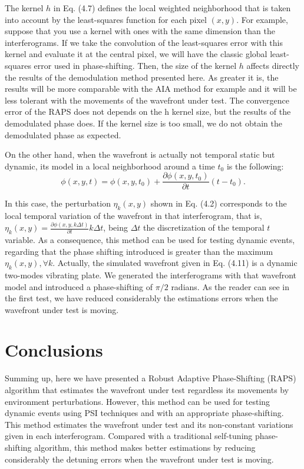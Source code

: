 The kernel $h$ in Eq. (4.7) defines the local weighted neighborhood that is
taken into account by the least-squares function for each pixel $(x,y)$. For
example, suppose that you use a kernel with ones with the same dimension than
the interferograms. If we take the convolution of the least-squares error with
this kernel and evaluate it at the central pixel, we will have the classic
global least-squares error used in phase-shifting. Then, the size of the kernel
$h$ affects directly the results of the demodulation method presented here. As
greater it is, the results will be more comparable with the AIA method for
example and it will be less tolerant with the movements of the wavefront under
test. The convergence error of the RAPS does not depends on the h kernel
size, but the results of the demodulated phase does. If the kernel size is too
small, we do not obtain the demodulated phase as expected.

On the other hand, when the wavefront is actually not temporal static but
dynamic, its model in a local neighborhood around a time $t_0$ is the following:
\begin{equation}
 \phi(x,y,t)= \phi(x,y,t_0) + \frac{\partial \phi(x,y,t_0) }{\partial t}
 (t-t_0).
\end{equation}

In this case, the perturbation $\eta_k(x,y)$ shown in Eq. (4.2) corresponds to
the local temporal variation of the wavefront in that interferogram, that is,
$\eta_k (x,y)= \frac{\partial \phi(x,y,k\Delta t)}{\partial t} k \Delta t$,
being $\Delta t$ the discretization of the temporal $t$ variable. As a
consequence, this method can be used for testing dynamic events, regarding that
the phase shifting introduced is greater than the maximum $\eta_k(x,y),\forall
k$. Actually, the simulated wavefront given in Eq. (4.11) is a dynamic
two-modes vibrating plate. We generated the interferograms with that wavefront
model and introduced a phase-shifting of $\pi/2$ radians. As the reader can
see in the first test, we have reduced considerably the estimations errors when
the wavefront under test is moving.
\section{Conclusions}
Summing up, here we have presented a Robust Adaptive Phase-Shifting (RAPS)
algorithm that estimates the wavefront under test regardless its movements by
environment perturbations. However, this method can be used for testing dynamic
events using PSI techniques and with an appropriate phase-shifting. This method
estimates the wavefront under test and its non-constant variations given in each
interferogram. Compared with a traditional self-tuning phase-shifting algorithm,
this method makes better estimations by reducing considerably the detuning
errors when the wavefront under test is moving.
